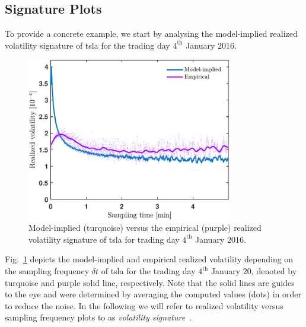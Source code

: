 \documentclass[11pt, a4paper]{thesis}  %
\begin{document}
\subsection{Signature Plots}
\label{section:signature_plot_discussion}
To provide a concrete example, we start by analysing the model-implied realized volatility signature of \ac{tsla} for the trading day $4^\textrm{th}$ January $2016$. 
%
%
\begin{figure}[H]
	\centering
	\includegraphics[width=0.8\textwidth]
	{./SignaturePlot/TSLA/20160104/signature_plot_predicted_vs_measured.pdf}
	\caption{Model-implied (turquoise) versus the empirical (purple) realized volatility signature of \ac{tsla} for trading day $4^\textrm{th}$ January $2016$.}
	\label{figure:results:signature_plot:tsla:20160104:detail}
\end{figure}
%
%
Fig.~\ref{figure:results:signature_plot:tsla:20160104:detail} depicts the model-implied and empirical realized volatility depending on the sampling frequency $\delta t$ of \ac{tsla} for the trading day $4^\textrm{th}$ January $20$, denoted by turquoise and purple solid line, respectively. Note that the solid lines are guides to the eye and were determined by averaging the computed values (dots) in order to reduce the noise. In the following we will refer to realized volatility versus sampling frequency plots to as {\it volatility signature}~\citep{Anderson:2000:GreatRealisations}.
% 
%
\end{document}
